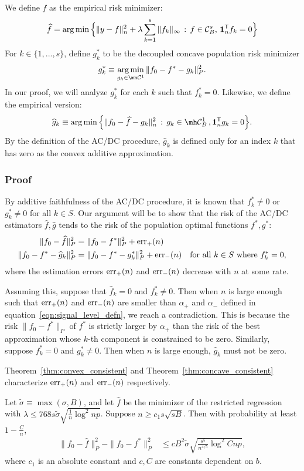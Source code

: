 We define $\hat{f}$ as the empirical risk minimizer:
\[
\widehat{f} = \arg\min \Big \{ \| y - f \|_n^2 + \lambda \sum_{k=1}^s \| f_k \|_\infty 
    \,:\, f \in \mathcal{C}^s_B,\, \mbox{\boldmath $1$}_n^{\mathsf{T}} f_k = 0 \Big \}
\]
For $k \in \{1,...,s\}$, define $g^*_k$ to be the decoupled concave population risk minimizer
\[
g^*_k \equiv \argmin_{g_k \in \mh \mathcal{C}^1} \| f_0 - f^* - g_k \|_P^2 .
\]
In our proof, we will analyze $g^*_k$ for each $k$ such that $f^*_k = 0$. Likewise, we define the empirical version:
\[
\hat{g}_k \equiv \argmin \Big\{ \| f_0 - \hat{f} - g_k \|_n^2 \,:\, g_k \in \mh \mathcal{C}^1_B \,, \mathbf{1}_n^\tran g_k = 0 \Big\}.
\]
By the definition of the AC/DC procedure, $\hat{g}_k$ is defined only
for an index $k$ that has zero as the convex additive approximation.


\subsubsection{Proof}
 
By additive faithfulness of the AC/DC procedure, it is known that $f^*_k \neq 0$ or $g^*_k \neq 0$ for all $k \in S$. 
Our argument will be to show that the risk of the AC/DC estimators $\hat{f}, \hat{g}$ tends to the risk of the population optimal functions $f^*, g^*$:
\begin{align*}
\| f_0 - \widehat{f} \|^2_P & = \| f_0 - f^* \|^2_P + \textrm{err}_+(n) \\
\| f_0 - f^* - \widehat{g}_k \|^2_P &=  \| f_0 - f^* - g^*_k \|^2_P + \textrm{err}_-(n) 
       \quad \textrm{for all $k \in S$ where $f^*_k = 0$},
\end{align*}
where the estimation errors $\textrm{err}_+(n)$ and $\textrm{err}_-(n)$ decrease with $n$ at some rate. 

Assuming this, suppose that $\hat{f}_k = 0$ and $f^*_k \neq 0$. Then when $n$ is large
enough such that $\textrm{err}_+(n)$ and $\textrm{err}_-(n)$ are smaller
than $\alpha_+$ and $\alpha_-$ defined in
equation~\eqref{eqn:signal_level_defn}, we reach a contradiction.
This is because the risk $\| f_0 - f^* \|_P$ of $f^*$ is
strictly larger by $\alpha_+$ than the risk of the best approximation
whose $k$-th component is constrained to be zero.
Similarly, suppose $f^*_k = 0$ and $g^*_k \neq 0$. Then when $n$ is large
enough, $\hat{g}_k$ must not be zero.

Theorem~\ref{thm:convex_consistent} and
Theorem~\ref{thm:concave_consistent} characterize $\textrm{err}_+(n)$ and
$\textrm{err}_-(n)$ respectively.

\begin{theorem}
\label{thm:convex_consistent}
Let $\tilde{\sigma} \equiv \max(\sigma, B)$, and let $\hat{f}$ be the
minimizer of the restricted regression with $\lambda \leq 768 s
\tilde{\sigma} \sqrt{ \frac{1}{n} \log^2 np}$.
Suppose $n \geq c_1 s \sqrt{sB}$.
Then with probability at least $1-\frac{C}{n}$,
\begin{align}
\|f_0 - \hat{f} \|_P^2 - \| f_0 - f^* \|_P^2 
&\leq c B^2 \tilde{\sigma} \sqrt{ \frac{s^5}{n^{4/5}} \log^2 Cnp},
\end{align}
where $c_1$ is an absolute constant and $c, C$ are constants dependent on $b$.
\end{theorem}


